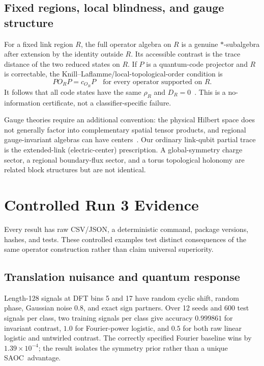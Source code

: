 \documentclass[letterpaper,journal]{IEEEtran}
\newcommand{\SAOC}{\textsc{SAOC}}
\begin{document}
\subsection{Fixed regions, local blindness, and gauge structure}

For a fixed link region $R$, the full operator algebra on $R$ is a genuine
$*$-subalgebra after extension by the identity outside $R$. Its accessible
contrast is the trace distance of the two reduced states on $R$. If $P$ is a
quantum-code projector and $R$ is correctable, the
Knill--Laflamme/local-topological-order condition is
\begin{equation}
P O_R P=c_{O_R}P
\quad\text{for every operator supported on }R.
\label{eq:localblind}
\end{equation}
It follows that all code states have the same $\rho_R$ and
$D_R=0$~\cite{knill1997,bravyi2010}. This is a no-information certificate,
not a classifier-specific failure.

Gauge theories require an additional convention: the physical Hilbert space
does not generally factor into complementary spatial tensor products, and
regional gauge-invariant algebras can have centers~\cite{donnelly2012,
casini2014}. Our ordinary link-qubit partial trace is the extended-link
(electric-center) prescription. A global-symmetry charge sector, a regional
boundary-flux sector, and a torus topological holonomy are related block
structures but are not identical.

\section{Controlled Run 3 Evidence}

Every result has raw CSV/JSON, a deterministic command, package versions,
hashes, and tests. These controlled examples test distinct consequences of
the same operator construction rather than claim universal superiority.

\subsection{Translation nuisance and quantum response}

Length-128 signals at DFT bins 5 and 17 have random cyclic shift, random
phase, Gaussian noise $0.8$, and exact sign partners. Over 12 seeds and 600
test signals per class, two training signals per class give accuracy
$0.999861$ for invariant contrast, $1.0$ for Fourier-power logistic, and
$0.5$ for both raw linear logistic and untwirled contrast. The correctly
specified Fourier baseline wins by $1.39\times10^{-4}$; the result isolates
the symmetry prior rather than a unique \SAOC\ advantage.
\end{document}
